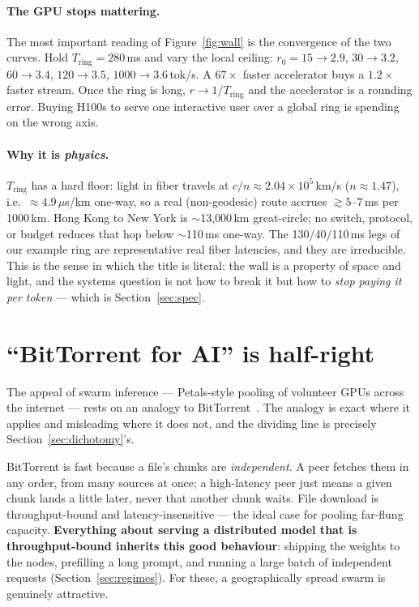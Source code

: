 \documentclass[11pt]{article}
\newcommand{\Tring}{\ensuremath{T_{\mathrm{ring}}}}
\begin{document}
\paragraph{The GPU stops mattering.} The most important reading of Figure~\ref{fig:wall} is the
convergence of the two curves. Hold $\Tring=280$\,ms and vary the local ceiling: $r_0=15\to
2.9$, $30\to3.2$, $60\to3.4$, $120\to3.5$, $1000\to3.6$\,tok/s. A $67\times$ faster accelerator buys
a $1.2\times$ faster stream. Once the ring is long, $r\to 1/\Tring$ and the accelerator is a rounding
error. Buying H100s to serve one interactive user over a global ring is spending on the wrong axis.

\paragraph{Why it is \emph{physics}.} $\Tring$ has a hard floor: light in fiber travels at
$c/n\approx2.04\times10^{5}$\,km/s ($n\approx1.47$), i.e.\ $\approx4.9\,\mu$s/km one-way, so a
real (non-geodesic) route accrues $\gtrsim5$--$7$\,ms per 1000\,km. Hong Kong to New York is
$\sim$13{,}000\,km great-circle; no switch, protocol, or budget reduces that hop below $\sim$110\,ms
one-way. The 130/40/110\,ms legs of our example ring are representative real fiber latencies, and
they are irreducible. This is the sense in which the title is literal: the wall is a property of
space and light, and the systems question is not how to break it but how to \emph{stop paying it
per token} --- which is Section~\ref{sec:spec}.

\section{``BitTorrent for AI'' is half-right}
\label{sec:bittorrent}

The appeal of swarm inference --- Petals-style pooling of volunteer GPUs across the internet ---
rests on an analogy to BitTorrent~\cite{petals}. The analogy is exact where it applies and
misleading where it does not, and the dividing line is precisely Section~\ref{sec:dichotomy}'s.

BitTorrent is fast because a file's chunks are \emph{independent}. A peer fetches them in any order,
from many sources at once; a high-latency peer just means a given chunk lands a little later, never
that another chunk waits. File download is throughput-bound and latency-insensitive --- the ideal
case for pooling far-flung capacity. \textbf{Everything about serving a distributed model that is
throughput-bound inherits this good behaviour}: shipping the weights to the nodes, prefilling a long
prompt, and running a large batch of independent requests (Section~\ref{sec:regimes}). For these, a
geographically spread swarm is genuinely attractive.
\end{document}
